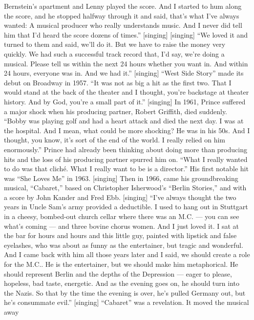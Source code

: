 \begin{itemize}
  Bernstein's apartment and Lenny played the score. And I started to hum
  along the score, and he stopped halfway through it and said, that's
  what I've always wanted: A musical producer who really understands
  music. And I never did tell him that I'd heard the score dozens of
  times.'' {[}singing{]} {[}singing{]} ``We loved it and turned to them
  and said, we'll do it. But we have to raise the money very quickly. We
  had such a successful track record that, I'd say, we're doing a
  musical. Please tell us within the next 24 hours whether you want in.
  And within 24 hours, everyone was in. And we had it.'' {[}singing{]}
  ``West Side Story'' made its debut on Broadway in 1957. ``It was not
  as big a hit as the first two. That I would stand at the back of the
  theater and I thought, you're backstage at theater history. And by
  God, you're a small part of it.'' {[}singing{]} In 1961, Prince
  suffered a major shock when his producing partner, Robert Griffith,
  died suddenly. ``Bobby was playing golf and had a heart attack and
  died the next day. I was at the hospital. And I mean, what could be
  more shocking? He was in his 50s. And I thought, you know, it's sort
  of the end of the world. I really relied on him enormously.'' Prince
  had already been thinking about doing more than producing hits and the
  loss of his producing partner spurred him on. ``What I really wanted
  to do was that cliché. What I really want to be is a director.'' His
  first notable hit was ``She Loves Me'' in 1963. {[}singing{]} Then in
  1966, came his groundbreaking musical, ``Cabaret,'' based on
  Christopher Isherwood's ``Berlin Stories,'' and with a score by John
  Kander and Fred Ebb. {[}singing{]} ``I've always thought the two years
  in Uncle Sam's army provided a deductible. I used to hang out in
  Stuttgart in a cheesy, bombed-out church cellar where there was an
  M.C. --- you can see what's coming --- and three bovine chorus women.
  And I just loved it. I sat at the bar for hours and hours and this
  little guy, painted with lipstick and false eyelashes, who was about
  as funny as the entertainer, but tragic and wonderful. And I came back
  with him all those years later and I said, we should create a role for
  the M.C.. He is the entertainer, but we should make him metaphorical.
  He should represent Berlin and the depths of the Depression --- eager
  to please, hopeless, bad taste, energetic. And as the evening goes on,
  he should turn into the Nazis. So that by the time the evening is
  over, he's pulled Germany out, but he's consummate evil.''
  {[}singing{]} ``Cabaret'' was a revelation. It moved the musical away

\end{itemize}
